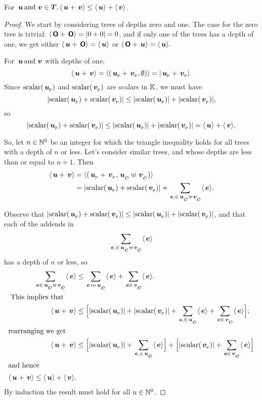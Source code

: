 \begin{proposition}\label{triangle1}
  For $\node{u} \mand \node{v} \in \DOM, \nabs{\node{u} + \node{v}}
  \leq \nabs{\node{u}} + \nabs{\node{v}}$.

  \begin{proof}
    We start by considering trees of depths zero and one. The case for
    the zero tree is trivial: $\nabs{\zerotree + \zerotree} = \abs{0 +
      0} = 0$, and if only one of the trees has a depth of one, we get
    either $\nabs{\node{u} + \zerotree} = \nabs{\node{u}}$ or
    $\nabs{\zerotree + \node{u}} = \nabs{\node{u}}.$

    For $\node{u} \mand \node{v}$  with depths of one, \[\nabs{\node{u} + \node{v}} = \nabs{(\nlabel{u}+\nlabel{v}, \emptyset)}= \abs{\nlabel{u}+\nlabel{v}}.\]
    Since $\scalar(\nlabel{u})$ and $\scalar(\nlabel{v})$ are scalars in $\FIELD$, we must have
    \[\abs{\sv{u} + \sv{v}} \leq \abs{\sv{u}}+\abs{\sv{v}},\]
    so \[\abs{\sv{u}+\sv{v}} \leq \abs{\sv{u}}+\abs{\sv{v}} = \nabs{\node{u}} + \nabs{\node{v}}.\]

    So, let $n\in\BBNO$ be an integer for which the triangle inequality holds for all
    trees with a depth of $n$ or less.  Let's consider similar trees,  and  whose depths are less
    than or equal to $n+1$. Then
    \begin{align*}
      \nabs{\node{u} + \node{v}} &= \nabs{(\nlabel{u} + \nlabel{v}, \child{u}\mscup\child{v})} \\
      &= \abs{\sv{u} + \sv{v}} + \sum_{\node{e},\in{\child{u}\mscup\child{v}}}\nabs{\node{e}}.
    \end{align*}

    Observe that $\abs{\sv{u} + \sv{v}} \leq \abs{\sv{u}} + \abs{\sv{v}}$, and that each 
    of the addends in \[\sum_{\node{e},\in{\child{u}\mscup\child{v}}}\nabs{\node{e}}\] has a depth of $n$ or
    less, so 
    \begin{align*}
      \sum_{\node{e}\in{\child{u}\mscup\child{v}}}\nabs{\node{e}} &\leq \sum_{\node{e}\,in{\child{u}}}\nabs{\node{e}} + \sum_{\node{e}\in\child{v}}\nabs{\node{e}}.\\
      \intertext{ This implies that}
      \nabs{\node{u} + \node{v}} &\leq \Bigl[\abs{\sv{u}} + \abs{\sv{v}} + \sum_{\node{e},\in\child{u}}\nabs{\node{e}} + \sum_{\node{e}\in\child{v}}\nabs{\node{e}}\Bigr];\\
      \intertext{rearranging we get}
      \nabs{\node{u} + \node{v}}  &\leq \Bigl[\abs{\sv{u}} + \sum_{\node{e},\in\child{u}}\nabs{\node{e}}\Bigr] + \Bigl[\abs{\sv{v}} + \sum_{\node{e}\in\child{v}}\nabs{\node{e}}\Bigr] \\
      \intertext{and hence}
      \nabs{\node{u} + \node{v}} \leq \nabs{\node{u}} + \nabs{\node{v}}.
    \end{align*}
    By induction the result must hold for all $n\in\BBNO$.
  \end{proof}
\end{proposition}

